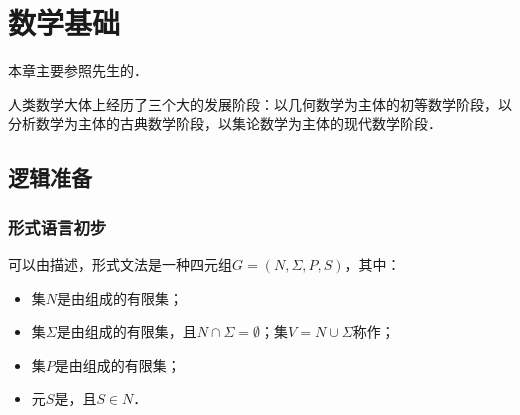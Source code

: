 \chapter{数学基础}

本章主要参照\citeauthor{WangFt2001}先生的\cite{WangFt2001}．

人类数学大体上经历了三个大的发展阶段：以几何数学为主体的初等数学阶段，以分析数学为主体的古典数学阶段，以集论数学为主体的现代数学阶段．

\section{逻辑准备}

\subsection{形式语言初步}

可以由描述，形式文法是一种四元组$G=(N,\Sigma,P,S)$，其中：
\begin{itemize}
    \item 集$N$是由组成的有限集；
    \item 集$\Sigma$是由组成的有限集，且$N\cap\Sigma=\emptyset$；集$V=N\cup\Sigma$称作；
    \item 集$P$是由组成的有限集；
    \item 元$S$是，且$S\in{}N$．
\end{itemize}

